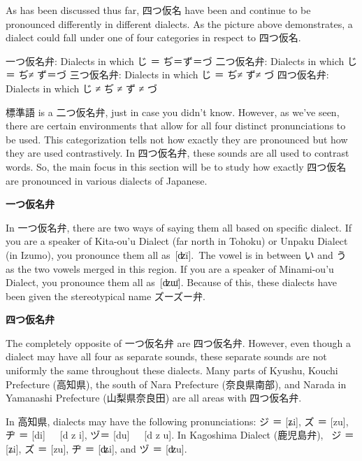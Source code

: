 \par{ As has been discussed thus far, 四つ仮名 have been and continue to be pronounced differently in different dialects. As the picture above demonstrates, a dialect could fall under one of four categories in respect to 四つ仮名. }

\par{一つ仮名弁: Dialects in which じ ＝ ぢ＝ず＝づ \hfill\break
二つ仮名弁: Dialects in which じ ＝ ぢ≠ ず＝づ \hfill\break
三つ仮名弁: Dialects in which じ ＝ ぢ≠ ず≠ づ \hfill\break
四つ仮名弁: Dialects in which じ ≠ ぢ ≠ ず ≠ づ }

\par{ 標準語 is a 二つ仮名弁, just in case you didn't know. However, as we've seen, there are certain environments that allow for all four distinct pronunciations to be used. This categorization tells not how exactly they are pronounced but how they are used contrastively. In 四つ仮名弁, these sounds are all used to contrast words. So, the main focus in this section will be to study how exactly 四つ仮名 are pronounced in various dialects of Japanese. }

\begin{center}
 \textbf{一つ仮名弁 }
\end{center}

\par{ In 一つ仮名弁, there are two ways of saying them all based on specific dialect. If you are a speaker of Kita-ou'u Dialect (far north in Tohoku) or Unpaku Dialect (in Izumo), you pronounce them all as [ʣï]. The vowel is in between い and う as the two vowels merged in this region.  If you are a speaker of Minami-ou'u Dialect, you pronounce them all as [ʣɯ̈]. Because of this, these dialects have been given the stereotypical name ズーズー弁. }

\begin{center}
 \textbf{四つ仮名弁 }
\end{center}

\par{ The completely opposite of 一つ仮名弁 are 四つ仮名弁. However, even though a dialect may have all four as separate sounds, these separate sounds are not uniformly the same throughout these dialects. Many parts of Kyushu, Kouchi Prefecture (高知県), the south of Nara Prefecture (奈良県南部), and Narada in Yamanashi Prefecture (山梨県奈良田) are all areas with 四つ仮名弁. }

\par{ In 高知県, dialects may have the following pronunciations: ジ ＝ [ʑi], ズ ＝ [zu], ヂ ＝ [di] ~ [d z i], ヅ＝ [du] ~ [d z u]. In Kagoshima Dialect (鹿児島弁),  ジ ＝[ʑi], ズ ＝ [zu], ヂ ＝ [ʥi], and ヅ ＝ [ʣu]. }

